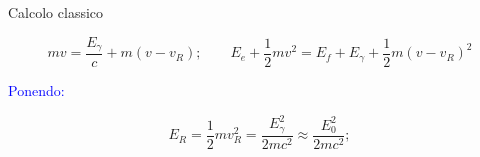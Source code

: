 \documentclass{beamer}
\begin{document}
\begin{frame}{Calcolo classico}

    \begin{equation*}
        mv = \dfrac{E_{\gamma}}{c} + m(v-v_{R}); \qquad
        E_{e} + \dfrac{1}{2}mv^{2} = E_{f} + E_{\gamma} + \dfrac{1}{2}m(v-v_{R})^{2}
    \end{equation*}

    \textcolor{blue}{Ponendo:}

    \begin{equation*}         
        E_{R} = \dfrac{1}{2}mv_{R}^{2} = \dfrac{E_{\gamma}^{2}}{2mc^{2}} \approx \dfrac{E_{0}^{2}}{2mc^{2}}; 
    \end{equation*}


\end{frame}
\end{document}
